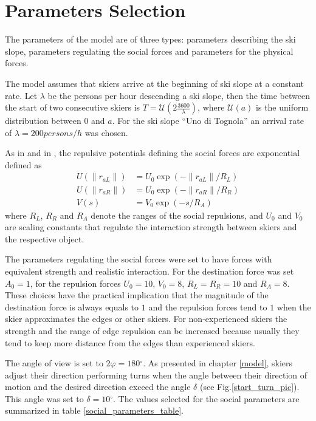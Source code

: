 \documentclass[12pt,a4paper,twoside]{book}
\newcommand{\norm}[1]{\lVert#1\rVert}
\newcommand{\degree}{\ensuremath{^\circ}}
\begin{document}
\section{Parameters Selection}
The parameters of the model are of three types: parameters describing the ski slope, parameters regulating the social forces and parameters for the physical forces.

The model assumes that skiers arrive at the beginning of ski slope at a constant rate. Let $\lambda$ be the persons per hour descending a ski slope, then the time between the start of two consecutive skiers is $T=\mathcal{U}\left(2\frac{3600}{\lambda}\right)$, where $\mathcal{U}(a)$ is the uniform distribution between $0$ and $a$. For the ski slope ``Uno di Tognola'' an arrival rate of $\lambda=200 persons/h$ was chosen.

As in \cite{hol2012} and in \cite{hel2008}, the repulsive potentials defining the social forces are exponential defined as
\begin{align}
U(\norm{r_{aL}})&=U_0 \exp(-\norm{r_{aL}}/R_L) \\
U(\norm{r_{aR}})&=U_0 \exp(-\norm{r_{aR}}/R_R) \\
V(s)&=V_0 \exp(-s/R_A)
\end{align}
where $R_L$, $R_R$ and $R_A$ denote the ranges of the social repulsions, and $U_0$ and $V_0$ are scaling constants that regulate the interaction strength between skiers and the respective object.

The parameters regulating the social forces were set to have forces with equivalent strength and realistic interaction. For the destination force was set $A_0=1$, for the repulsion forces $U_0=10$, $V_0=8$, $R_L=R_R=10$ and $R_A=8$. These choices have the practical implication that the magnitude of the destination force is always equals to $1$ and the repulsion forces tend to $1$ when the skier approximates the edges or other skiers. For non-experienced skiers the strength and the range of edge repulsion can be increased because usually they tend to keep more distance from the edges than experienced skiers.

 The angle of view is set to $2\varphi=180\degree$. As presented in chapter \ref{model}, skiers adjust their direction performing turns when the angle between their direction of motion and the desired direction exceed the angle $\delta$ (see Fig.\ref{start_turn_pic}). This angle was set to $\delta=10\degree$. The values selected for the social parameters are summarized in table \ref{social_parameters_table}.
\end{document}
